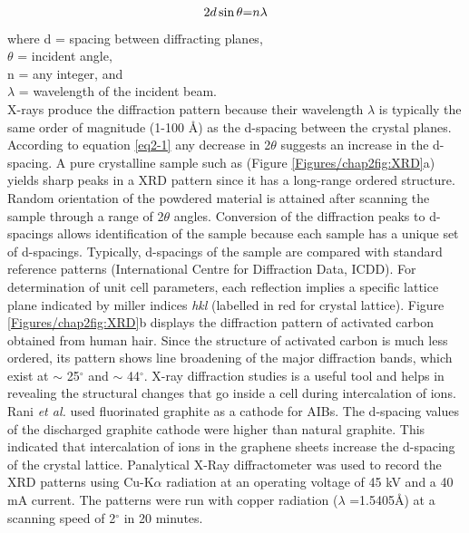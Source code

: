  \begin{equation} \label{eq2-1}
     2d\sin\theta \text= n{\lambda}
 \end{equation}
 where d = spacing between diffracting planes,\\
$\theta$ = incident angle,\\ 
n = any integer, and \\
$\lambda$ = wavelength of the incident beam.\\
X-rays produce the diffraction pattern because their wavelength $\lambda$ is typically the same order of magnitude (1-100 \AA) as the d-spacing between the crystal planes. According to equation \ref{eq2-1} any decrease in 2$\theta$ suggests an increase in the d-spacing. A pure crystalline sample such as  (Figure \ref{Figures/chap2fig:XRD}a) yields sharp peaks in a XRD pattern since it has a long-range ordered structure. Random orientation of the powdered material is attained after scanning the sample through a range of 2$\theta$ angles. Conversion of the diffraction peaks to d-spacings allows identification of the sample because each sample has a unique set of d-spacings. Typically, d-spacings of the sample are compared with standard reference patterns (International Centre for Diffraction Data, ICDD). For determination of unit cell parameters, each reflection implies a specific lattice plane indicated by miller indices \textit{hkl} (labelled in red  for  crystal lattice). Figure \ref{Figures/chap2fig:XRD}b displays the diffraction pattern of activated carbon obtained from human hair. Since the structure of activated carbon is much less ordered, its pattern shows line broadening of the major diffraction bands, which exist at $\sim$ 25$^{\circ}$  and $\sim$ 44$^{\circ}$.
X-ray diffraction studies is a useful tool and helps in revealing the structural changes that go inside a cell during intercalation of ions. Rani \textit{et al.} used fluorinated graphite as a cathode for AIBs. The d-spacing values of the discharged graphite cathode were higher than natural graphite. This indicated that intercalation of  ions in the graphene sheets increase the d-spacing of the crystal lattice\cite{rani_fluorinated_2013}.
Panalytical X-Ray diffractometer was used to record the XRD patterns using Cu-K$\alpha$ radiation at an operating voltage of 45 kV and a 40 mA current. The patterns were run with copper radiation ($\lambda$ =1.5405\AA) at a scanning speed of 2$^{\circ}$ in 20 minutes. 

